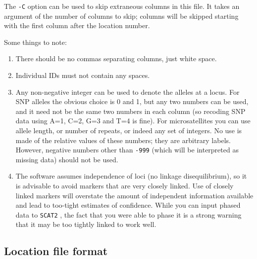 \documentclass[10pt,titlepage,times,letterpaper]{article}
\def\SCAT{{\tt SCAT2} }
\begin{document}
The {\tt -C} option can be used to skip extraneous columns in this
file.  It takes an argument of the number of columns to skip;
columns will be skipped starting with the first column after the location
number.

Some things to note:
\begin{enumerate}
\item There should be no commas separating columns, just white space.
\item Individual IDs must not contain any spaces.
\item Any non-negative integer can be used to denote the alleles at a locus.
For SNP alleles the obvious choice is 0 and 1, but any two numbers can be used,
and it need not be the same two numbers in each column (so recoding SNP data 
using A=1, C=2, G=3 and T=4 is fine).  For microsatellites you can use 
allele length, or number of repeats, or indeed any set of integers.  No use 
is made of the relative values of these numbers; they are arbitrary labels.
However, negative numbers other than {\tt -999} (which will be interpreted as
missing data) should not be used.
\item The software assumes independence of loci (no linkage disequilibrium),
so it is advisable to avoid markers that are very closely linked. 
Use of closely linked markers will overstate the amount of independent 
information available and lead to too-tight estimates of confidence.
While you can input phased data to \SCAT, the fact that you were able to phase
it is a strong warning that it may be too tightly linked to work well.
\end{enumerate}

\subsection{Location file format}
\end{document}
